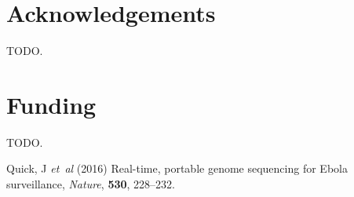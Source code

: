 \documentclass{bioinfo}
\begin{document}
\section*{Acknowledgements}

TODO.

\section*{Funding}

TODO.

%
%
%
%
%
%
%
%
%


\begin{thebibliography}{}

Quick, J {\it et~al} (2016) Real-time, portable genome sequencing for Ebola surveillance, {\it Nature}, {\bf 530}, 228--232.







\end{thebibliography}
\end{document}

